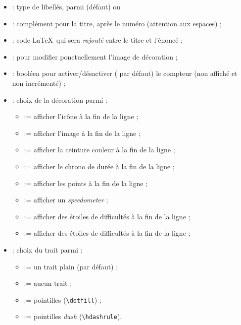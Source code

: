 \documentclass[french,11pt,a4paper]{article}
\begin{document}
\begin{itemize}
	\item {} : type de libellés, parmi  (défaut) ou 
	\item {} : complément pour la titre, après le numéro (attention aux espaces) ;
	\item {} : code \LaTeX\ qui sera \textit{rajouté} entre le titre et l'énoncé ;
	\item {} : pour modifier ponctuellement l'image de décoration ;
	\item {} : booléen pour activer/désactiver ( par défaut) le compteur (non affiché et non incrémenté) ;
	\item {} : choix de la décoration parmi :
	\begin{itemize}
		\item {} := afficher l'icône  à la fin de la ligne ;
		\item {} := afficher l'image  à la fin de la ligne ;
		\item {} := afficher la ceinture couleur  à la fin de la ligne ;
		\item {} := afficher le chrono de durée  à la fin de la ligne ;
		\item {} := afficher les points  à la fin de la ligne ;
		\item {} := afficher un \textit{speedometer} ;
		\item {} := afficher des étoiles de difficultés à la fin de la ligne ;
		\item {} := afficher des étoiles de difficultés à la fin de la ligne ;
	\end{itemize}
	\item {} : choix du trait parmi :
	\begin{itemize}
		\item {} := un trait plain (par défaut) ;
		\item {} := aucun trait ;
		\item {} := pointilles (\texttt{\textbackslash dotfill}) ;
		\item {} := pointilles \textit{dash} (\texttt{\textbackslash hdashrule}).
	\end{itemize}
\end{itemize}
\end{document}
